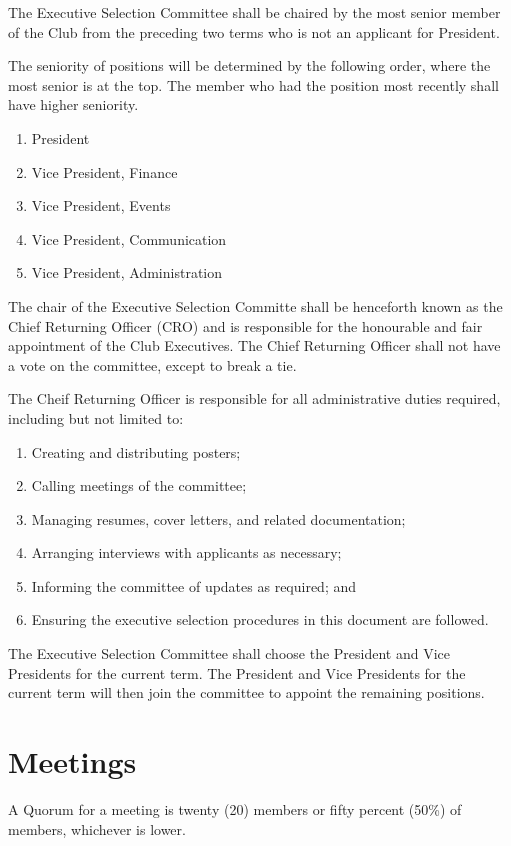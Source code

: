 \documentclass[11pt]{mathsoc}
\begin{document}
The Executive Selection Committee shall be chaired by the most senior member 
of the Club from the preceding two terms who is not an applicant for President.

The seniority of positions will be determined by the following order, where 
the most senior is at the top. The member who had the position most recently 
shall have higher seniority. 

\begin{enumerate}
    \item President
    \item Vice President, Finance
    \item Vice President, Events
    \item Vice President, Communication
    \item Vice President, Administration
\end{enumerate}

The chair of the Executive Selection Committe shall be henceforth known as the
Chief Returning Officer (CRO) and is responsible for the honourable and fair
appointment of the Club Executives. The Chief Returning Officer shall not have
a vote on the committee, except to break a tie. 

The Cheif Returning Officer is responsible for all administrative duties 
required, including but not limited to:
\begin{enumerate}
    \item Creating and distributing posters;
    \item Calling meetings of the committee;
    \item Managing resumes, cover letters, and related documentation;
    \item Arranging interviews with applicants as necessary;
    \item Informing the committee of updates as required; and
    \item Ensuring the executive selection procedures in this document are 
        followed.
\end{enumerate}

The Executive Selection Committee shall choose the President and Vice 
Presidents for the current term. The President and Vice Presidents for the 
current term will then join the committee to appoint the remaining positions.

\section{Meetings}
A Quorum for a meeting is twenty (20) members or fifty percent (50\%) of 
members, whichever is lower.
\end{document}
